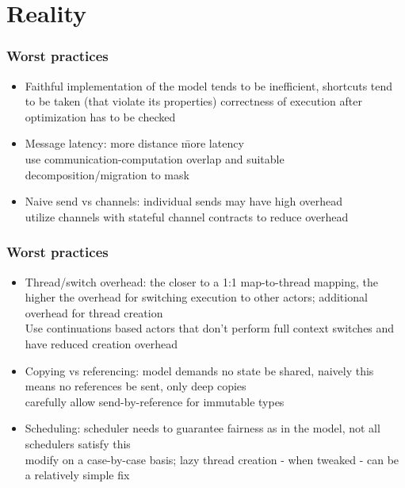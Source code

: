\section{Reality}
\begin{frame}
\frametitle{Worst practices}
\begin{itemize}
\item Faithful implementation of the model tends to be inefficient, shortcuts tend to be taken (that violate its properties) \textrightarrow correctness of execution after optimization has to be checked
\end{itemize}
\vspace{5mm}
\begin{itemize}
\item Message latency: more distance \= more latency \\
\textrightarrow use communication-computation overlap and suitable decomposition/migration to mask
\item Naive send vs channels: individual sends may have high overhead \\
\textrightarrow utilize channels with stateful channel contracts to reduce overhead
\end{itemize}
\end{frame}

\begin{frame}
\frametitle{Worst practices}
\begin{itemize}
\item Thread/switch overhead: the closer to a 1:1 map-to-thread mapping, the higher the overhead for switching execution to other actors; additional overhead for thread creation \\
\textrightarrow Use continuations based actors that don't perform full context switches and have reduced creation overhead
\item Copying vs referencing: model demands no state be shared, naively this means no references be sent, only deep copies \\
\textrightarrow carefully allow send-by-reference for immutable types
\item Scheduling: scheduler needs to guarantee fairness as in the model, not all schedulers satisfy this \\
\textrightarrow modify on a case-by-case basis; lazy thread creation - when tweaked - can be a relatively simple fix
\end{itemize}
\end{frame}

